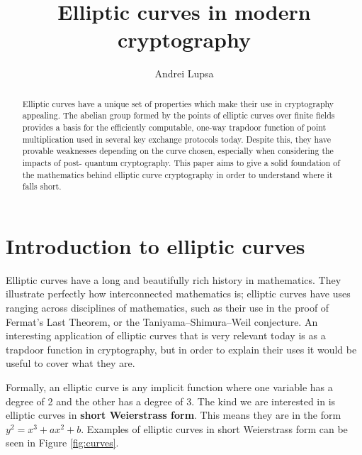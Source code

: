 \documentclass[a4paper]{article}
\title{Elliptic curves in modern cryptography}
\author{Andrei Lupsa}
\begin{document}
\maketitle

\begin{abstract}
Elliptic curves have a unique set of properties which make their use in cryptography appealing. The abelian group formed by the points of elliptic curves over finite fields provides a basis for the efficiently computable, one-way trapdoor function of point multiplication used in several key exchange protocols today. Despite this, they have provable weaknesses depending on the curve chosen, especially when considering the impacts of post- quantum cryptography. This paper aims to give a solid foundation of the mathematics behind elliptic curve cryptography in order to understand where it falls short.
\end{abstract}


\section{Introduction to elliptic curves}\label{intro}

Elliptic curves have a long and beautifully rich history in mathematics. They illustrate perfectly how interconnected mathematics is; elliptic curves have uses ranging across disciplines of mathematics, such as their use in the proof of Fermat's Last Theorem, or the Taniyama–Shimura–Weil conjecture. An interesting application of elliptic curves that is very relevant today is as a trapdoor function in cryptography, but in order to explain their uses it would be useful to cover what they are.

Formally, an elliptic curve is any implicit function where one variable has a degree of 2 and the other has a degree of 3. The kind we are interested in is elliptic curves in \textbf{short Weierstrass form}. This means they are in the form $y^2 = x^3 + ax^2 + b$. Examples of elliptic curves in short Weierstrass form can be seen in Figure \ref{fig:curves}.\cite{guide}
\end{document}
